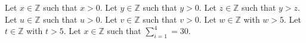 Let $x \in \mathbb{Z}$ such that $x > 0$.
Let $y \in \mathbb{Z}$ such that $y > 0$.
Let $z \in \mathbb{Z}$ such that $y > z$.
Let $u \in \mathbb{Z}$ such that $u > 0$.
Let $v \in \mathbb{Z}$ such that $v > 0$.
Let $w \in \mathbb{Z}$ with $w > 5$.
Let $t \in \mathbb{Z}$ with $t > 5$.
Let $x \in \mathbb{Z}$ such that $\sum_{i=1}^{4} = 30$.